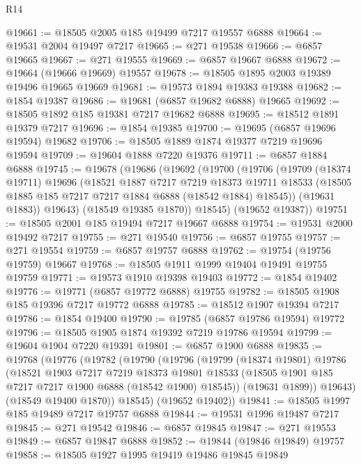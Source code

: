 \begin{lexlean}{R14}
\begin{coremodule}
@19661 := @18505 @2005 @185 @19499 @7217 @19557 @6888
@19664 := @19531 @2004 @19497 @7217
@19665 := @271 @19538
@19666 := @6857 @19665
@19667 := @271 @19555
@19669 := @6857 @19667 @6888
@19672 := @19664 (@19666 @19669) @19557
@19678 := @18505 @1895 @2003 @19389 @19496 @19665 @19669
@19681 := @19573 @1894 @19383 @19388
@19682 := @1854 @19387
@19686 := @19681 (@6857 @19682 @6888) @19665
@19692 := @18505 @1892 @185 @19381 @7217 @19682 @6888
@19695 := @18512 @1891 @19379 @7217
@19696 := @1854 @19385
@19700 := @19695 (@6857 @19696 @19594) @19682
@19706 := @18505 @1889 @1874 @19377 @7219 @19696 @19594
@19709 := @19604 @1888 @7220 @19376
@19711 := @6857 @1884 @6888
@19745 := @19678
    (@19686
      (@19692
        (@19700
          (@19706
            (@19709
              (@18374 @19711)
              @19696
              (@18521
                @1887
                @7217
                @7219
                @18373
                @19711
                @18533
                (@18505 @1885 @185 @7217 @7217 @1884 @6888 (@18542 @1884) @18545))
              (@19631 @1883))
            @19643)
          (@18549 @19385 @1870))
        @18545)
      (@19652 @19387))
@19751 := @18505 @2001 @185 @19494 @7217 @19667 @6888
@19754 := @19531 @2000 @19492 @7217
@19755 := @271 @19540
@19756 := @6857 @19755
@19757 := @271 @19554
@19759 := @6857 @19757 @6888
@19762 := @19754 (@19756 @19759) @19667
@19768 := @18505 @1911 @1999 @19404 @19491 @19755 @19759
@19771 := @19573 @1910 @19398 @19403
@19772 := @1854 @19402
@19776 := @19771 (@6857 @19772 @6888) @19755
@19782 := @18505 @1908 @185 @19396 @7217 @19772 @6888
@19785 := @18512 @1907 @19394 @7217
@19786 := @1854 @19400
@19790 := @19785 (@6857 @19786 @19594) @19772
@19796 := @18505 @1905 @1874 @19392 @7219 @19786 @19594
@19799 := @19604 @1904 @7220 @19391
@19801 := @6857 @1900 @6888
@19835 := @19768
    (@19776
      (@19782
        (@19790
          (@19796
            (@19799
              (@18374 @19801)
              @19786
              (@18521
                @1903
                @7217
                @7219
                @18373
                @19801
                @18533
                (@18505 @1901 @185 @7217 @7217 @1900 @6888 (@18542 @1900) @18545))
              (@19631 @1899))
            @19643)
          (@18549 @19400 @1870))
        @18545)
      (@19652 @19402))
@19841 := @18505 @1997 @185 @19489 @7217 @19757 @6888
@19844 := @19531 @1996 @19487 @7217
@19845 := @271 @19542
@19846 := @6857 @19845
@19847 := @271 @19553
@19849 := @6857 @19847 @6888
@19852 := @19844 (@19846 @19849) @19757
@19858 := @18505 @1927 @1995 @19419 @19486 @19845 @19849

\end{coremodule}
\end{lexlean}
